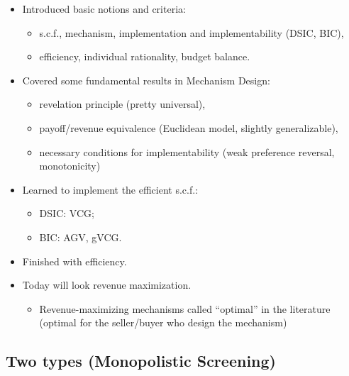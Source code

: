 \documentclass[english]{beamer}		%
\def\lyxframeend{} %
\begin{document}
\begin{itemize}
	\item Introduced basic notions and criteria:
	\begin{itemize}
		\item s.c.f., mechanism, implementation and implementability (DSIC, BIC),
		\item efficiency, individual rationality, budget balance.
	\end{itemize}
	\pause
	\item Covered some fundamental results in Mechanism Design:
	\begin{itemize}
		\item revelation principle (pretty universal),
		\item payoff/revenue equivalence (Euclidean model, slightly generalizable),
		\item necessary conditions for implementability (weak preference reversal, monotonicity)
	\end{itemize}
	\pause
	\item Learned to implement the efficient s.c.f.:
	\begin{itemize}
		\item DSIC: VCG;
		\item BIC: AGV, gVCG.
	\end{itemize}
\end{itemize}
\lyxframeend


\begin{itemize}
	\item Finished with efficiency.
	\item Today will look revenue maximization.
	\begin{itemize}
		\item Revenue-maximizing mechanisms called ``optimal'' in the literature (optimal for the seller/buyer who design the mechanism)
	\end{itemize}
\end{itemize}
\lyxframeend


\subsection{Two types (Monopolistic Screening)}
\end{document}
